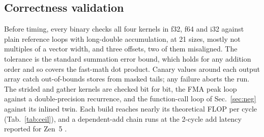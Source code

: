 \documentclass{article}
\begin{document}
\subsection{Correctness validation}\label{sec:valid}
Before timing, every binary checks all four kernels in f32, f64 and i32 against plain reference loops with long-double accumulation, at 21 sizes, mostly not multiples of a vector width, and three offsets, two of them misaligned. The tolerance is the standard summation error bound, which holds for any addition order and so covers the fast-math dot product. Canary values around each output array catch out-of-bounds stores from masked tails; any failure aborts the run. The strided and gather kernels are checked bit for bit, the FMA peak loop against a double-precision recurrence, and the function-call loop of Sec.~\ref{sec:neg} against its inlined twin. Each build reaches nearly its theoretical FLOP per cycle (Tab.~\ref{tab:ceil}), and a dependent-add chain runs at the 2-cycle add latency reported for Zen~5 \cite{amdhc}.
\end{document}
